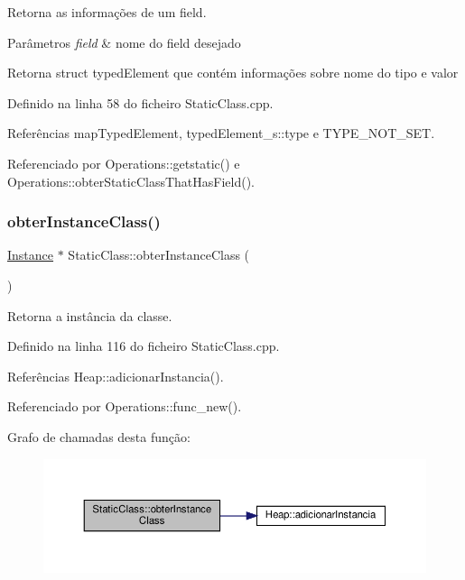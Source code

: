 Retorna as informações de um field. 


\begin{DoxyParams}{Parâmetros}
{\em field} & nome do field desejado \\
\hline
\end{DoxyParams}
\begin{DoxyReturn}{Retorna}
struct typed\+Element que contém informações sobre nome do tipo e valor 
\end{DoxyReturn}


Definido na linha 58 do ficheiro Static\+Class.\+cpp.



Referências map\+Typed\+Element, typed\+Element\+\_\+s\+::type e T\+Y\+P\+E\+\_\+\+N\+O\+T\+\_\+\+S\+ET.



Referenciado por Operations\+::getstatic() e Operations\+::obter\+Static\+Class\+That\+Has\+Field().

\mbox{\label{classStaticClass_a2990aa887bcb06eaec53afe467e361ef}} 
\subsubsection{\texorpdfstring{obter\+Instance\+Class()}{obterInstanceClass()}}
{\footnotesize\ttfamily \hyperlink{classInstance}{Instance} $\ast$ Static\+Class\+::obter\+Instance\+Class (\begin{DoxyParamCaption}{ }\end{DoxyParamCaption})}



Retorna a instância da classe. 



Definido na linha 116 do ficheiro Static\+Class.\+cpp.



Referências Heap\+::adicionar\+Instancia().



Referenciado por Operations\+::func\+\_\+new().

Grafo de chamadas desta função\+:
\nopagebreak
\begin{figure}[H]
\begin{center}
\leavevmode
\includegraphics[width=350pt]{classStaticClass_a2990aa887bcb06eaec53afe467e361ef_cgraph}
\end{center}
\end{figure}


